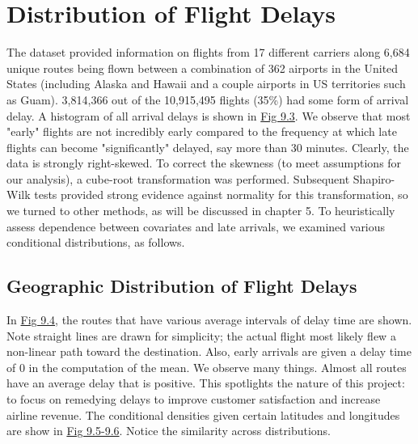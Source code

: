 \documentclass[12pt, a4paper, openany]{book}
\newcommand\tab[1][1cm]{\hspace*{#1}}
\begin{document}
	\section{Distribution of Flight Delays}
	\tab The dataset provided information on flights from 17 different carriers along 6,684 unique routes being flown between a combination of 362 airports in the United States (including Alaska and Hawaii and a couple airports in US territories such as Guam). 3,814,366 out of the 10,915,495 flights (35\%) had some form of arrival delay. A histogram of all arrival delays is shown in \underline{Fig 9.3}. We observe that most "early" flights are not incredibly early compared to the frequency at which late flights can become "significantly" delayed, say more than 30 minutes. Clearly, the data is strongly right-skewed. To correct the skewness (to meet assumptions for our analysis), a cube-root transformation was performed. Subsequent Shapiro-Wilk tests provided strong evidence against normality for this transformation, so we turned to other methods, as will be discussed in chapter 5. To heuristically assess dependence between covariates and late arrivals, we examined various conditional distributions, as follows.\\

		\subsection{Geographic Distribution of Flight Delays}
		
			\tab In \underline{Fig 9.4}, the routes that have various average intervals of delay time are shown. Note straight lines are drawn for simplicity; the actual flight most likely flew a non-linear path toward the destination. Also, early arrivals are given a delay time of 0 in the computation of the mean. We observe many things. Almost all routes have an average delay that is positive. This spotlights the nature of this project: to focus on remedying delays to improve customer satisfaction and increase airline revenue. The conditional densities given certain latitudes and longitudes are show in \underline{Fig 9.5-9.6}. Notice the similarity across distributions. 
\end{document}
